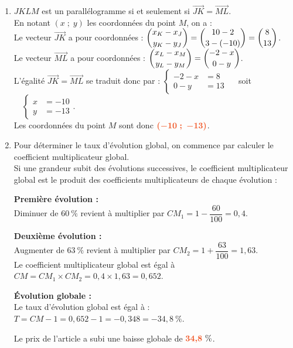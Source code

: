 \documentclass[a4paper,11pt]{article}
\begin{document}
\begin{seance}{}
\begin{enumerate}
\item  $JKLM$ est un parallélogramme si et seulement si $\overrightarrow{JK} = \overrightarrow{ML}$.\\En notant $(x\;;\;y)$ les coordonnées du point $M$, on a :\\Le vecteur $\overrightarrow{JK}$ a pour coordonnées : $\dbinom{x_K - x_J}{y_K - y_J }=\dbinom{10-2}{3-(-10)} = \dbinom{8}{13}$.\\Le vecteur $\overrightarrow{ML}$ a pour coordonnées : $\dbinom{x_L - x_M}{y_L - y_M }=\dbinom{-2 - x}{0 - y}$.\\L'égalité $\overrightarrow{JK} = \overrightarrow{ML}$ se traduit donc par : $\begin{cases}-2 - x &= 8 \\ 0 - y &= 13\end{cases}\quad$ soit $\quad\begin{cases}x &= -10 \\ y &= -13\end{cases}$.\\Les coordonnées du point $M$ sont donc ${\color[HTML]{f15929}\boldsymbol{(-10\;;\;-13)}}$.

\item Pour déterminer le taux d'évolution global, on commence par calculer le coefficient multiplicateur global.\\Si une grandeur subit des évolutions successives, le coefficient multiplicateur global est le produit des coefficients multiplicateurs de chaque évolution :

\medskip
\textbf{Première évolution :} \\
          Diminuer de $60~\%$ revient à multiplier par $CM_1 = 1 - \dfrac{60}{100} = 0{,}4$.

\medskip
\textbf{Deuxième évolution :}\\ Augmenter de $63~\%$ revient à multiplier par $CM_2 = 1 + \dfrac{63}{100} = 1{,}63$.\\Le coefficient multiplicateur global est égal à $CM = CM_1 \times CM_2 = 0{,}4 \times 1{,}63 =0{,}652$.

\medskip
\textbf{Évolution globale :}\\Le taux d'évolution global est égal à : $T=CM-1=0{,}652-1=-0{,}348=-34{,}8~\%$.

\medskip
Le prix de l'article a subi une baisse globale de ${\color[HTML]{f15929}\boldsymbol{34{,}8}}~\%$.

\end{enumerate}

\end{seance}
\end{document}

